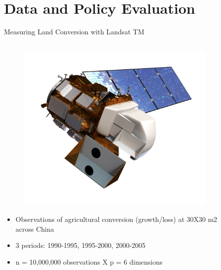 \documentclass[newPxFont]{beamer}
\begin{document}
\section{Data and Policy Evaluation}
\begin{frame}[c]{Measuring Land Conversion with Landsat TM}
	\begin{columns}
		\begin{column}{.6\linewidth}
			\begin{figure}
				\centering
				\includegraphics[width=0.4\linewidth]{Landsat8.jpg}
			\end{figure}
	\begin{itemize}
		\item{Observations of agricultural conversion (growth/loss) at 30X30 m2 across China}\\
		\item{3 periods: 1990-1995, 1995-2000, 2000-2005}\\
		\item{n = 10,000,000 observations X p = 6 dimensions}\\
	\end{itemize}
		\end{column}
		\begin{column}{.6\linewidth}
			\begin{figure}
				\centering

\end{figure}
\end{column}
\end{columns}
\end{frame}
\end{document}
